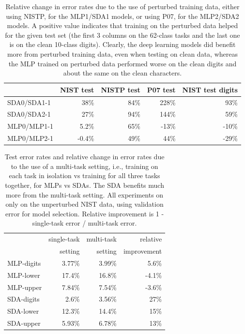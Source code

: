 \documentclass{article} %
\begin{document}
\begin{table}[ht]
\caption{Relative change in error rates due to the use of perturbed training data,
either using NISTP, for the MLP1/SDA1 models, or using P07, for the MLP2/SDA2 models.
A positive value indicates that training on the perturbed data helped for the
given test set (the first 3 columns on the 62-class tasks and the last one is
on the clean 10-class digits). Clearly, the deep learning models did benefit more
from perturbed training data, even when testing on clean data, whereas the MLP
trained on perturbed data performed worse on the clean digits and about the same
on the clean characters. }
\label{tab:perturbation-effect}
\begin{center}
\begin{tabular}{|l|r|r|r|r|} \hline
      & NIST test          & NISTP test      & P07 test       & NIST test digits   \\ \hline
SDA0/SDA1-1   &  38\%      &  84\%           & 228\%          &  93\% \\ \hline 
SDA0/SDA2-1   &  27\%      &  94\%           & 144\%          &  59\% \\ \hline 
MLP0/MLP1-1   &  5.2\%     &  65\%           & -13\%          & -10\%  \\ \hline 
MLP0/MLP2-1   &  -0.4\%    &  49\%           & 44\%           & -29\% \\ \hline 
\end{tabular}
\end{center}
\end{table}

\begin{table}[ht]
\caption{Test error rates and relative change in error rates due to the use of
a multi-task setting, i.e., training on each task in isolation vs training
for all three tasks together, for MLPs vs SDAs. The SDA benefits much
more from the multi-task setting. All experiments on only on the
unperturbed NIST data, using validation error for model selection.
Relative improvement is 1 - single-task error / multi-task error.}
\label{tab:multi-task}
\begin{center}
\begin{tabular}{|l|r|r|r|} \hline
             & single-task  & multi-task  & relative \\ 
             & setting      & setting     & improvement \\ \hline
MLP-digits   &  3.77\%      &  3.99\%     & 5.6\%   \\ \hline 
MLP-lower   &  17.4\%      &  16.8\%     &  -4.1\%    \\ \hline 
MLP-upper   &  7.84\%     &  7.54\%      & -3.6\%    \\ \hline 
SDA-digits   &  2.6\%      &  3.56\%     & 27\%    \\ \hline 
SDA-lower   &  12.3\%      &  14.4\%    & 15\%    \\ \hline 
SDA-upper   &  5.93\%     &  6.78\%      & 13\%    \\ \hline 
\end{tabular}
\end{center}
\end{table}

\fi

{


%
%
}
\end{document}
